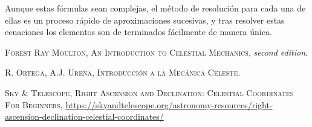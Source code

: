 \documentclass[11pt]{article}
\begin{document}
Aunque estas fórmulas sean complejas, el método de resolución para cada una de ellas es un proceso rápido de aproximaciones sucesivas, y tras resolver estas ecuaciones los elementos son de terminados fácilmente de manera única.\\











\newpage

\begin{thebibliography}{99}
 \textsc{Forest Ray Moulton}, \textsc{An Introduction to Celestial Mechanics}, \textit{second edition}.

 \textsc{R. Ortega, A.J. Ureña}, \textsc{Introducción a la Mecánica Celeste}.

 \textsc{Sky \& Telescope}, \textsc{Right Ascension and Declination: Celestial Coordinates For Beginners}, \url{https://skyandtelescope.org/astronomy-resources/right-ascension-declination-celestial-coordinates/}

\end{thebibliography}
\end{document}
